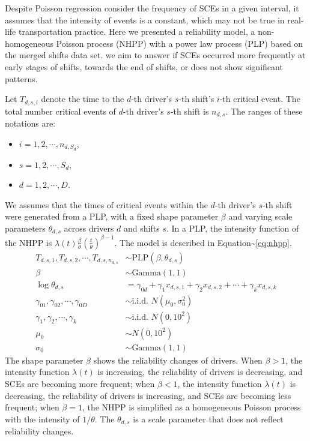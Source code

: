 \documentclass[12pt]{book}
\numberwithin{equation}{chapter}
\providecommand{\tightlist}{%
  \setlength{\itemsep}{0pt}\setlength{\parskip}{0pt}}
\begin{document}
Despite Poisson regression consider the frequency of SCEs in a given interval, it assumes that the intensity of events is a constant, which may not be true in real-life transportation practice. Here we presented a reliability model, a non-homogeneous Poisson process (NHPP) with a power law process (PLP) based on the merged shifts data set. we aim to answer if SCEs occurred more frequently at early stages of shifts, towards the end of shifts, or does not show significant patterns.

Let \(T_{d, s, i}\) denote the time to the \(d\)-th driver's \(s\)-th shift's \(i\)-th critical event. The total number critical events of \(d\)-th driver's \(s\)-th shift is \(n_{d,s}\). The ranges of these notations are:

\begin{itemize}
\tightlist
\item
  \(i = 1, 2, \cdots, n_{d, S_d}\),
\item
  \(s = 1, 2, \cdots, S_d\),
\item
  \(d = 1, 2, \cdots, D\).
\end{itemize}

We assumes that the times of critical events within the \(d\)-th driver's \(s\)-th shift were generated from a PLP, with a fixed shape parameter \(\beta\) and varying scale parameters \(\theta_{d, s}\) across drivers \(d\) and shifts \(s\). In a PLP, the intensity function of the NHPP is \(\lambda(t) \frac{\beta}{\theta}(\frac{t}{\theta})^{\beta-1}\). The model is described in Equation\textasciitilde{}\ref{eq:nhpp}.
\begin{equation}\label{eq:nhpp}
\begin{aligned}
  T_{d, s, 1}, T_{d, s, 2}, \cdots , T_{d, s, n_{d, s}} & \sim \text{PLP}(\beta, \theta_{d, s})\\
  \beta & \sim \text{Gamma}(1, 1)\\
  \log\theta_{d, s} &= \gamma_{0d} + \gamma_{1}x_{d, s, 1} + \gamma_{2}x_{d, s, 2} + \cdots + \gamma_{k}x_{d, s, k}\\
  \gamma_{01}, \gamma_{02}, \cdots, \gamma_{0D} & \sim \text{i.i.d. }N(\mu_0, \sigma_0^2)\\
  \gamma_1, \gamma_2, \cdots, \gamma_k & \sim \text{i.i.d. }N(0, 10^2)\\
  \mu_0 &\sim N(0, 10^2) \\
  \sigma_0 &\sim \text{Gamma}(1, 1)
\end{aligned}
\end{equation}
The shape parameter \(\beta\) shows the reliability changes of drivers. When \(\beta > 1\), the intensity function \(\lambda(t)\) is increasing, the reliability of drivers is decreasing, and SCEs are becoming more frequent; when \(\beta < 1\), the intensity function \(\lambda(t)\) is decreasing, the reliability of drivers is increasing, and SCEs are becoming less frequent; when \(\beta = 1\), the NHPP is simplified as a homogeneous Poisson process with the intensity of \(1/\theta\). The \(\theta_{d, s}\) is a scale parameter that does not reflect reliability changes.
\end{document}
